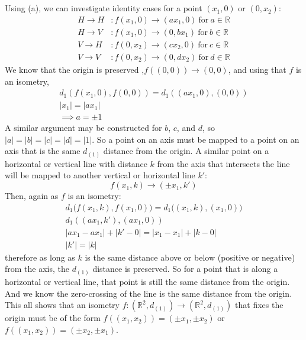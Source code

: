 \documentclass{jhwhw}
\begin{document}
\part{}
Using (a), we can investigate identity cases for a point $(x_1,0)$ or $(0,x_2)$:
\begin{align}
H\to H&: f(x_1,0) \to (ax_1,0) \: \text{for} \: a \in \mathbb{R}\\
H \to V&: f(x_1,0) \to (0,bx_1) \: \text{for} \: b \in \mathbb{R}\\
V \to H&: f(0,x_2) \to (cx_2,0) \: \text{for} \: c \in \mathbb{R}\\
V \to V&: f(0,x_2) \to (0,dx_2) \: \text{for} \: d \in \mathbb{R}
\end{align}
We know that the origin is preserved ,$f((0,0)) \to (0,0)$, and using that $f$ is an isometry, 
\begin{gather}
d_1(f(x_1,0),f(0,0)) = d_1((ax_1,0),(0,0))\\
|x_1|= |ax_1| \\
\implies a = \pm 1
\end{gather}
A similar argument may be constructed for $b$, $c$, and $d$, so $|a|=|b|=|c|=|d|=|1|$. So a point on an axis must be mapped to a point on an axis that is the same $d_{(1)}$ distance from the origin. A similar point on a horizontal or vertical line with distance $k$ from the axis that intersects the line will be mapped to another vertical or horizontal line $k'$:
\begin{equation}
f(x_1,k) \to (\pm x_1,k')
\end{equation}
Then, again as $f$ is an isometry:
\begin{gather}
d_1\big(f(x_1,k),f(x_1,0)\big)=d_1\big((x_1,k),(x_1,0)\big)\\
d_1(( ax_1,k'),(ax_1,0)) \\
|ax_1 - ax_1| + |k' - 0| = |x_1 - x_1| + |k - 0|\\
|k'| = |k|
\end{gather}
therefore as long as $k$ is the same distance above or below (positive or negative) from the axis, the $d_{(1)}$ distance is preserved. So for a point that is along a horizontal or vertical line, that point is still the same distance from the origin. And we know the zero-crossing of the line is the same distance from the origin. This all shows that an isometry  $f:(\mathbb{R}^2,d_{(1)})\to (\mathbb{R}^2,d_{(1)})$ that fixes the origin must be of the form $f((x_1,x_2) )= (\pm x_1,\pm x_2)$ or $f((x_1,x_2)) = (\pm x_2, \pm x_1)$.
\end{document}
